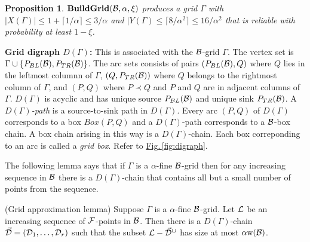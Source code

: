 \documentclass{acmsmall}
\newtheorem{prop}[theorem]{Proposition}
\newcommand{\cB}{{\cal B}}
\newcommand{\cD}{{\cal D}}
\newcommand{\cF}{{\cal F}}
\newcommand{\cL}{{\cal L}}
\newcommand{\Fig}[1]{\hyperref[fig:#1]{Fig.\,\ref*{fig:#1}}} %
\newcommand{\bx}{Box}
\newcommand{\width}{{\bf {\rm  w}}}
\newcommand{\griderror}{\xi}
\newcommand{\gridprec}{\alpha}
\newcommand{\buildgrid}{{\rm {\bf BuildGrid}}}
\begin{document}
\begin{prop}
\label{prop:buildgrid}  $\buildgrid(\cB,\gridprec,\griderror)$ produces a grid $\Gamma$ with 
$|X(\Gamma)| \leq 1+\lceil 1/\gridprec \rceil \leq 3/\gridprec$  and 
$|Y(\Gamma) \leq \lceil 8/\gridprec^2 \rceil \leq 16/\gridprec^2$  that is reliable with probability at least $1-\griderror$.
\end{prop}



{\bf Grid digraph $D(\Gamma)$:} This is associated with the
$\cB$-grid $\Gamma$. The vertex set is 
$\Gamma\cup \{P_{BL}(\cB),P_{TR}(\cB)\}$. The arc sets
consists of pairs $(P_{BL}(\cB),Q)$ where $Q$ lies in the leftmost columnn of $\Gamma$,
$(Q,P_{TR}(\cB))$ where $Q$ belongs to the rightmost column of $\Gamma$,  and $(P,Q)$ where
$P \prec Q$ and $P$ and $Q$ are in adjacent columns of $\Gamma$. $D(\Gamma)$ is acyclic and has unique
source $P_{BL}(\cB)$ and unique sink $P_{TR}(\cB)$.  A {\em $D(\Gamma)$-path} is a source-to-sink path in $D(\Gamma)$.
Every arc $(P,Q)$ of $D(\Gamma)$ corresponds to a box $\bx(P,Q)$ and a $D(\Gamma)$-path
corresponds to a $\cB$-box chain.  A box chain arising in this way is a $D(\Gamma)$-chain.
Each box correponding to an arc is called a \emph{grid box}.
Refer to \Fig{digraph}.

\medskip

The following lemma says that if $\Gamma$ is a $\gridprec$-fine $\cB$-grid then for any increasing sequence in $\cB$
there is a $D(\Gamma)$-chain that contains all but a small number of points from the sequence.  

\begin{lemma}(Grid approximation lemma)
\label{lem:grid-approx}
Suppose $\Gamma$ is a $\gridprec$-fine $\cB$-grid.
Let $\cL$ be an increasing sequence of $\cF$-points in $\cB$.
Then there is
a $D(\Gamma)$-chain $\vec{\cD}=(\cD_1,\dots,\cD_r)$
such that the subset $\cL-\vec{\cD}^{\cup}$ 
has size at most $\gridprec \width(\cB)$.
\end{lemma}
\end{document}
